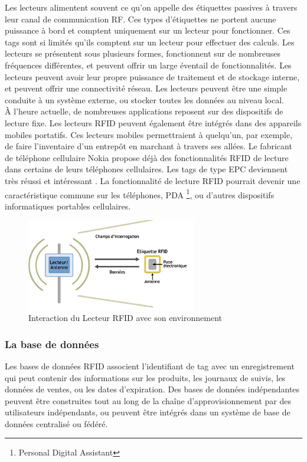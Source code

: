 \documentclass[11pt, a4paper, twoside]{book}
\begin{document}
Les lecteurs alimentent souvent ce qu'on appelle des étiquettes passives à travers leur canal de communication RF.
Ces types d'étiquettes ne portent aucune puissance à bord et comptent uniquement sur un lecteur pour fonctionner. Ces tags sont si limités qu'ils comptent sur un lecteur pour effectuer des calculs.
Les lecteurs se présentent sous plusieurs formes, fonctionnent sur de nombreuses fréquences différentes, et peuvent offrir un large éventail de fonctionnalités. Les lecteurs peuvent avoir leur propre puissance de traitement et de stockage interne, et peuvent offrir une connectivité réseau. Les lecteurs peuvent être une simple conduite à un système externe, ou stocker toutes les données au niveau local.\\

À l'heure actuelle, de nombreuses applications reposent sur des dispositifs de lecture fixe. Les lecteurs RFID peuvent également être intégrés dans des appareils mobiles portatifs. Ces lecteurs mobiles permettraient à quelqu'un, par exemple, de faire l'inventaire d'un entrepôt en marchant à travers ses allées. Le fabricant de téléphone cellulaire Nokia propose déjà des fonctionnalités RFID de lecture dans certains de leurs téléphones cellulaires. Les tags de type EPC deviennent très réussi et intéressant . La fonctionnalité de lecture RFID pourrait devenir une caractéristique commune sur les téléphones, PDA \footnote{Personal Digital Assistant}, ou d'autres dispositifs informatiques portables cellulaires.
\begin{figure}[H]
\centering
\includegraphics[height=4cm]{reader}
\caption{Interaction du Lecteur RFID avec son environnement}
\end{figure}
\subsubsection{La base de données}
Les bases de données RFID associent l'identifiant de tag avec un enregistrement qui peut contenir des informations sur les produits, les journaux de suivis, les données de ventes, ou les dates d'expiration. Des bases de données indépendantes peuvent être construites tout au long de la chaîne d'approvisionnement par des utilisateurs indépendants, ou peuvent être intégrés dans un système de base de données centralisé ou fédéré.\\
\end{document}
